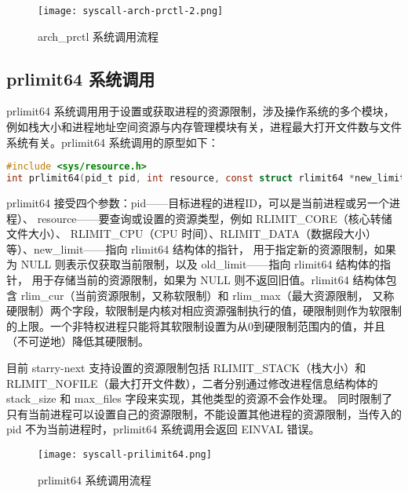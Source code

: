 \begin{figure}[H]
    \centering
    \texttt{[image: syscall-arch-prctl-2.png]}
    \caption{arch\_prctl 系统调用流程}
    \label{fig:arch-prctl}
\end{figure}

\subsection{prlimit64 系统调用}

prlimit64 系统调用用于设置或获取进程的资源限制，涉及操作系统的多个模块，例如栈大小和进程地址空间资源与内存管理模块有关，进程最大打开文件数与文件系统有关。prlimit64 系统调用的原型如下：
\begin{lstlisting}[language=c, caption=prlimit64 系统调用函数原型]
#include <sys/resource.h>
int prlimit64(pid_t pid, int resource, const struct rlimit64 *new_limit, struct rlimit64 *old_limit);
\end{lstlisting}

prlimit64 接受四个参数：pid——目标进程的进程ID，可以是当前进程或另一个进程）、
resource——要查询或设置的资源类型，例如 RLIMIT\_CORE（核心转储文件大小）、
RLIMIT\_CPU（CPU 时间）、RLIMIT\_DATA（数据段大小）等）、new\_limit——指向 rlimit64 结构体的指针，
用于指定新的资源限制，如果为 NULL 则表示仅获取当前限制，以及 old\_limit——指向 rlimit64 结构体的指针，
用于存储当前的资源限制，如果为 NULL 则不返回旧值。rlimit64 结构体包含 rlim\_cur（当前资源限制，又称软限制）和 rlim\_max（最大资源限制，
又称硬限制）两个字段，软限制是内核对相应资源强制执行的值，硬限制则作为软限制的上限。一个非特权进程只能将其软限制设置为从0到硬限制范围内的值，并且（不可逆地）降低其硬限制。

目前 starry-next 支持设置的资源限制包括 RLIMIT\_STACK（栈大小）和 RLIMIT\_NOFILE（最大打开文件数），二者分别通过修改进程信息结构体的 stack\_size 和 max\_files 字段来实现，其他类型的资源不会作处理。
同时限制了只有当前进程可以设置自己的资源限制，不能设置其他进程的资源限制，当传入的 pid 不为当前进程时，prlimit64 系统调用会返回 EINVAL 错误。

\begin{figure}[H]
    \centering
    \texttt{[image: syscall-prilimit64.png]}
    \caption{prlimit64 系统调用流程}
    \label{fig:prlimit64}
\end{figure}

